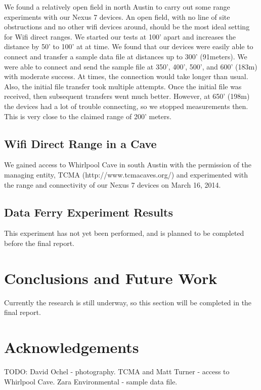 \documentclass[10pt,twocolumn]{article}
\begin{document}
We found a relatively open field in north Austin to carry out some range experiments with our Nexus 7 devices.
An open field, with no line of site obstructions and no other wifi devices around, should be the most ideal setting for Wifi direct ranges.
We started our tests at 100' apart and increases the distance by 50' to 100' at at time.
We found that our devices were easily able to connect and transfer a sample data file at distances up to 300' (91meters). 
We were able to connect and send the sample file at 350', 400', 500', and 600' (183m) with moderate success. 
At times, the connection would take longer than usual.
Also, the initial file transfer took multiple attempts.
Once the initial file was received, then subsequent transfers went much better.
However, at 650' (198m) the devices had a lot of trouble connecting, so we stopped measurements then.
This is very close to the claimed range of 200' meters.

\subsection{Wifi Direct Range in a Cave}
We gained access to Whirlpool Cave in south Austin with the permission of the managing entity, TCMA (http://www.tcmacaves.org/) and experimented with the range and connectivity of our Nexus 7 devices on March 16, 2014.

\subsection{Data Ferry Experiment Results}
This experiment has not yet been performed, and is planned to be completed before the final report.

\section{Conclusions and Future Work}
Currently the research is still underway, so this section will be completed in the final report.

\section{Acknowledgements}
TODO:
David Ochel - photography. 
TCMA and Matt Turner - access to Whirlpool Cave. 
Zara Environmental - sample data file.

% 



\end{document}
